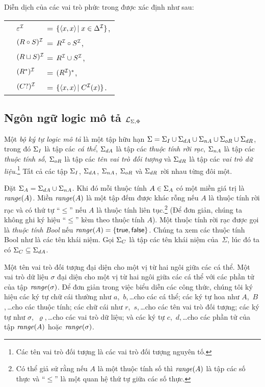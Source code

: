 Diễn dịch của các vai trò phức trong \ALCreg được xác định như sau:\\[1.0ex]
\begin{tabular}{c l l}
	& $\varepsilon^{\mathcal{I}}$ & =\; $\{\left\langle x,x\right\rangle\! \mid x \in \Delta^{\mathcal{I}}\}$,\\[0.5ex]
	& $(R \circ S)^{\mathcal{I}}\!\!\!\!\!$ & =\; $R^{\mathcal{I}} \circ S^{\mathcal{I}}$, \\[0.5ex]
	& $(R \sqcup S)^{\mathcal{I}}\!\!\!\!\!$ & =\; $R^{\mathcal{I}} \cup S^{\mathcal{I}}$, \\[0.5ex]
	& $(R^*)^{\mathcal{I}}$       & =\; $(R^{\mathcal{I}})^*$, \\[0.5ex]
	& $(C?)^{\mathcal{I}}$        & =\; $\{\left\langle x,x\right\rangle\! \mid C^{\mathcal{I}}(x)\}$.
\end{tabular}


\subsection{Ngôn ngữ logic mô tả $\mathcal{L}_{\Sigma,\Phi}$}
\label{sec:Chap1.LSPLanguage}

Một {\em bộ ký tự logic mô tả} là một tập hữu hạn $\Sigma = \Sigma_I \cup \Sigma_{dA} \cup \Sigma_{nA} \cup \Sigma_{oR} \cup \Sigma_{dR}$, trong đó $\Sigma_I$ là tập các {\em cá thể}, $\Sigma_{dA}$ là tập các {\em thuộc tính rời rạc}, $\Sigma_{nA}$ là tập các {\em thuộc tính số}, $\Sigma_{oR}$ là tập các {\em tên vai trò đối tượng} và $\Sigma_{dR}$ là tập các {\em vai trò dữ liệu}.\footnote{Các tên vai trò đối tượng là các vai trò đối tượng nguyên tố.} Tất cả các tập $\Sigma_I$, $\Sigma_{dA}$, $\Sigma_{nA}$, $\Sigma_{oR}$ và $\Sigma_{dR}$ rời nhau từng đôi một.

Đặt $\Sigma_A = \Sigma_{dA} \cup \Sigma_{nA}$. Khi đó mỗi thuộc tính $A \in \Sigma_A$ có một miền giá trị là $\mathit{range}(A)$. Miền $\mathit{range}(A)$ là một tập đếm được khác rỗng nếu $A$ là thuộc tính rời rạc và có thứ tự ``$\leq$'' nếu $A$ là thuộc tính liên tục.\footnote{Có thể giả sử rằng nếu $A$ là một thuộc tính số thì $\mathit{range}(A)$ là tập các số thực và ``$\leq$'' là một quan hệ thứ tự giữa các số thực.} (Để đơn giản, chúng ta không ghi ký hiệu ``$\leq$'' kèm theo thuộc tính $A$).
%
Một thuộc tính rời rạc được gọi là {\em thuộc tính Bool} nếu $\mathit{range}(A) = \{\mathsf{true},\mathsf{false}\}$. Chúng ta xem các thuộc tính Bool như là các tên khái niệm. Gọi $\Sigma_C$ là tập các tên khái niệm của~$\Sigma$, lúc đó ta có $\Sigma_C \subseteq \Sigma_{dA}$.

Một tên vai trò đối tượng đại diện cho một vị từ hai ngôi giữa các cá thể. Một vai trò dữ liệu $\sigma$ đại diện cho một vị từ hai ngôi giữa các cá thể với các phần tử của tập $\mathit{range}(\sigma)$.
%
Để đơn giản trong việc biểu diễn các công thức, chúng tôi ký hiệu các ký tự chữ cái thường như $a$,~$b$,\,\ldots\;cho các cá thể; các ký tự hoa như $A$,~$B$,\,\ldots\;cho các thuộc tính; các chữ cái như $r$,~$s$,\,\ldots\;cho các tên vai trò đối tượng; các ký tự như $\sigma$,~$\varrho$,\,\ldots\;cho các vai trò dữ liệu; và các ký tự $c$,~$d$,\,\ldots\;cho các phần tử của tập $\mathit{range}(A)$ hoặc $\mathit{range}(\sigma)$.


